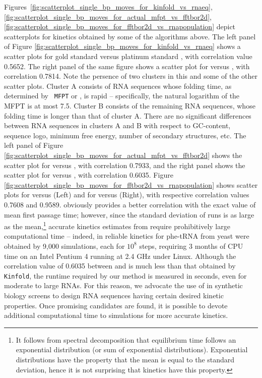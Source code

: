 Figures~\ref{fig:scatterplot_single_bp_moves_for_kinfold_vs_rnaeq},
\ref{fig:scatterplot_single_bp_moves_for_actual_mfpt_vs_fftbor2d},
\ref{fig:scatterplot_single_bp_moves_for_fftbor2d_vs_rnapopulation}
depict scatterplots for kinetics obtained by some of the algorithms
above. The left panel of
Figure \ref{fig:scatterplot_single_bp_moves_for_kinfold_vs_rnaeq}
shows a scatter plots for gold standard \rnamfpt versus platinum
standard \rnaeq, with correlation value 0.5652. The right
panel of the same figure shows a scatter plot for \kinfold versus
\rnaeq, with correlation 0.7814. Note the persence of two
clusters in this and some of the other scatter plots. Cluster A
consists of RNA sequences whose folding time, as determined by {\tt
MFPT} or \rnaeq, is rapid -- specifically, the natural
logarithm of the MFPT is at most 7.5. Cluster B consists of the
remaining RNA sequences, whose folding time is longer than that of
cluster A. There are no significant differences between RNA sequences
in clusters A and B with respect to GC-content, sequence logo, minimum
free energy, number of secondary structures, etc.  The left panel of
Figure \ref{fig:scatterplot_single_bp_moves_for_actual_mfpt_vs_fftbor2d}
shows the scatter plot for \rnamfpt versus \kinfold, with
correlation 0.7933, and the right panel shows the scatter plot for
\rnamfpt versus \fftmfpt, with correlation 0.6035.
Figure \ref{fig:scatterplot_single_bp_moves_for_fftbor2d_vs_rnapopulation}
shows scatter plots for \fftmfpt versus \kinfold (Left) and
for \fftmfpt versus \ffteq (Right), with respective
correlation values 0.7608 and 0.9589. \kinfold obviously provides
a better correlation with the exact value of mean first passage time;
however, since the standard deviation of \kinfold runs is as
large as the mean,\footnote{It follows from spectral decomposition that
equilibrium time follows an exponential distribution (or sum of
exponential distributions). Exponential distributions have the property
that the mean is equal to the standard deviation, hence
it is not surprising that \kinfold
kinetics have this property.} accurate kinetics estimates
from \kinfold require prohibitively large computational time -- indeed, in
\cite{wolfingerStadler:kinetics} reliable kinetics for phe-tRNA from
yeast were obtained by 9,000 \kinfold simulations, each for $10^8$
steps, requiring 3 months of CPU time on an Intel Pentium 4 running at
2.4 GHz under Linux. Although the correlation value of 0.6035 between
\rnamfpt and \fftmfpt is much less than that obtained by {\tt
Kinfold}, the runtime required by our method \fftmfpt is measured
in seconds, even for moderate to large RNAs. For this reason, we
advocate the use of \fftmfpt in synthetic biology screens to
design RNA sequences having certain desired kinetic properties. Once
promising candidates are found, it is possible to devote additional
computational time to \kinfold simulations for more accurate
kinetics.


